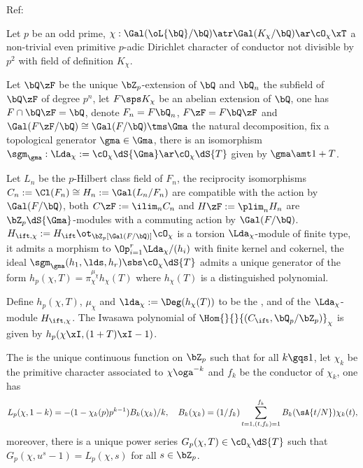 \documentclass[article, a4paper, twoside]{universal}
\begin{document}
Ref:~\cite{MW1984}

\begin{stp}
    Let $p$ be an odd prime, $\chi:\Gal(\oL{\bQ}/\bQ)\atr\Gal(K_{\chi}/\bQ)\ar\cO_{\chi}\xT$ a non-trivial even primitive $p$-adic Dirichlet character of conductor not divisible by $p^{2}$ with field of definition $K_{\chi}$.
\end{stp}

\begin{stp}
	Let $\bQ\zF$ be the unique $\bZ_{p}$-extension of $\bQ$ and $\bQ_{n}$ the subfield of $\bQ\zF$ of degree $p^{n}$, let $F\sps K_{\chi}$ be an abelian extension of $\bQ$, one has $F\cap\bQ\zF=\bQ$, denote $F_{n}=F\bQ_{n}$, $F\zF=F\bQ\zF$ and $\Gal(F\zF/\bQ)\cong\Gal(F/\bQ)\tms\Gma$ the natural decomposition, fix a topological generator $\gma\in\Gma$, there is an isomorphism $\sgm_{\gma}:\Lda_{\chi}:=\cO_{\chi}\dS{\Gma}\ar\cO_{\chi}\dS{T}$ given by $\gma\amt1+T$.

	Let $L_{n}$ be the $p$-Hilbert class field of $F_{n}$, the reciprocity isomorphisms $C_{n}:=\Cl(F_{n})\cong H_{n}:=\Gal(L_{n}/F_{n})$ are compatible with the action by $\Gal(F/\bQ)$, both $C\zF:=\ilim_{n}C_{n}$ and $H\zF:=\plim_{n}H_{n}$ are $\bZ_{p}\dS{\Gma}$-modules with a commuting action by $\Gal(F/\bQ)$. $H_{\ift,\chi}:=H_{\ift}\ot_{\bZ_{p}[\Gal(F/\bQ)]}\cO_{\chi}$ is a torsion $\Lda_{\chi}$-module of finite type, it admits a morphism to $\Op_{i=1}^{r}\Lda_{\chi}/(h_{i})$ with finite kernel and cokernel, the ideal $\sgm_{\gma}(h_{1},\lds,h_{r})\sbs\cO_{\chi}\dS{T}$ admits a unique generator of the form $h_{p}(\chi,T)=\pi_{\chi}^{\mu_{\chi}}h_{\chi}(T)$ where $h_{\chi}(T)$ is a distinguished polynomial.

	Define $h_{p}(\chi,T)$, $\mu_{\chi}$ and $\lda_{\chi}:=\Deg(h_{\chi}(T))$ to be the ,  and  of the $\Lda_{\chi}$-module $H_{\ift,\chi}$. The Iwasawa polynomial of $\Hom{}{}{(C_{\ift},\bQ_{p}/\bZ_{p})}_{\chi}$ is given by $h_{p}(\chi\xI,(1+T)\xI-1)$.
\end{stp}

\begin{stp}
	The  is the unique continuous function on $\bZ_{p}$ such that for all $k\gqs1$, let $\chi_{k}$ be the primitive character associated to $\chi\oga^{-k}$ and $f_{k}$ be the conductor of $\chi_{k}$, one has
	\[
		L_{p}(\chi,1-k)=-(1-\chi_{k}(p)p^{k-1})B_{k}(\chi_{k})/k,\quad B_{k}(\chi_{k})=(1/f_{k})\sum_{t=1, (t,f_{k})=1}^{f_{k}}B_{k}(\sA{t/N})\chi_{k}(t),
	\]
	moreover, there is a unique power series $G_{p}(\chi,T)\in\cO_{\chi}\dS{T}$ such that $G_{p}(\chi,u^{s}-1)=L_{p}(\chi,s)$ for all $s\in\bZ_{p}$. 
\end{stp}
\end{document}
